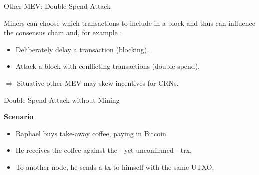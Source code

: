 \documentclass[handout]{beamer}
\begin{document}
\begin{frame}{Other MEV: Double Spend Attack}

Miners can choose which transactions to include in a block and thus can influence the consensus chain and, for example :
\begin{itemize}
	\item	Deliberately delay a transaction (blocking).
	\item	Attack a block with conflicting transactions (double spend).
\end{itemize}

\vspace{0.5 em}
$\Rightarrow$ Situative other MEV may skew incentives for CRNs.


\end{frame}

\begin{frame}{Double Spend Attack without Mining}

\textbf{Scenario}
\begin{itemize}
	\item	Raphael buys take-away coffee, paying in Bitcoin.
	\item	He receives the coffee against the - yet unconfirmed - trx.
	\item<2-> To another node, he sends a tx to himself with the same UTXO.
\end{itemize}


\begin{center}
	\begin{tikzpicture}[scale=0.9, every node/.style ={scale=0.9}]
		
	\end{tikzpicture}
\end{center}


\end{frame}
\end{document}
